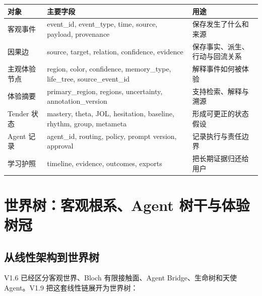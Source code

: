 \documentclass[UTF8,a4paper,11pt]{ctexart}
\begin{document}
\begin{center}
\begin{longtable}{@{}p{3.6cm}p{5.0cm}p{5.9cm}@{}}
\toprule
\textbf{对象} & \textbf{主要字段} & \textbf{用途} \\
\midrule
客观事件 & event\_id, event\_type, time, source, payload, provenance & 保存发生了什么和来源 \\
因果边 & source, target, relation, confidence, evidence & 保存事实、派生、行动与回流关系 \\
主观体验节点 & region, color, confidence, memory\_type, life\_tree, source\_event\_id & 解释事件如何被体验 \\
体验摘要 & primary\_region, regions, uncertainty, annotation\_version & 支持检索、解释与溯源 \\
Tender 状态 & mastery, theta, JOL, hesitation, baseline, rhythm, group, metameta & 形成可更正的状态假设 \\
Agent 记录 & agent\_id, routing, policy, prompt version, approval & 记录执行与责任边界 \\
学习护照 & timeline, evidence, outcomes, exports & 把长期证据归还给用户 \\
\bottomrule
\end{longtable}
\end{center}

\newpage
\section{世界树：客观根系、Agent 树干与体验树冠}

\subsection{从线性架构到世界树}

V1.6 已经区分客观世界、Bloch 有限接触面、Agent Bridge、生命树和天使 Agent。V1.9 把这套线性链展开为世界树：
\end{document}
